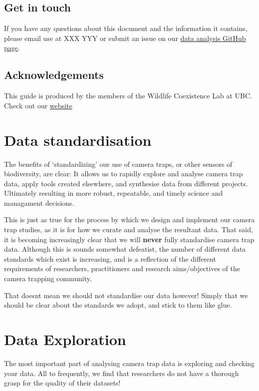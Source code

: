 \documentclass[]{book}
\begin{document}
\section{Get in touch}\label{get-in-touch}

If you have any questions about this document and the information it
contains, please email use at XXX YYY or submit an issue on our
\href{https://github.com/WildCoLab/WildCAM_Data_Analysis}{data analysis
GitHub page}.

\section{Acknowledgements}\label{acknowledgements}

This guide is produced by the members of the Wildlife Coexistence Lab at
UBC. Check out our \href{}{website}

\chapter{Data standardisation}\label{data-standardisation}

The benefits of `standardizing' our use of camera traps, or other
sensors of biodiversity, are clear: It allows us to rapidly explore and
analyse camera trap data, apply tools created elsewhere, and synthesise
data from different projects. Ultimately resulting in more robust,
repeatable, and timely science and managament decisions.

This is just as true for the process by which we design and implement
our camera trap studies, as it is for how we curate and analyse the
resultant data. That said, it is becoming increasingly clear that we
will \textbf{never} fully standardise camera trap data. Although this is
sounds somewhat defeatist, the number of different data standards which
exist is increasing, and is a reflection of the different requirements
of researchers, practitioners and research aims/objectives of the camera
trapping community.

That doesnt mean we should not standardise our data however! Simply that
we should be clear about the standards we adopt, and stick to them like
glue.

\chapter{Data Exploration}\label{data-exploration}

The most important part of analysing camera trap data is exploring and
checking your data. All to frequently, we find that researchers do not
have a thorough grasp for the quality of their datasets!
\end{document}
